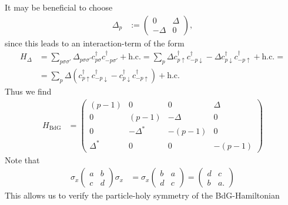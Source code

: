 \documentclass[english, parskip=full]{scrartcl}
\newcommand{\kla}{}
\newcommand{\tecxt}{}
\begin{document}
It may be beneficial to choose
\begin{align}
\Delta_p &:= \begin{pmatrix}
0 & \Delta \\ -\Delta & 0
\end{pmatrix},
\end{align}
since this leads to an interaction-term of the form
\begin{align}
H_\Delta &= \sum_{p\sigma\sigma'} \Delta_{p\sigma\sigma'} c_{p\sigma}^\dagger c_{-p\sigma'}^\dagger + \tecxt\text{h.c.} = \sum_p \Delta c_{p\uparrow}^\dagger c_{-p\downarrow}^\dagger - \Delta c_{p\downarrow}^\dagger c_{-p\uparrow}^\dagger + \tecxt\text{h.c.} = \\
&= \sum_p\Delta \kla\left( c_{p\uparrow}^\dagger c_{-p\downarrow}^\dagger - c_{p\downarrow}^\dagger c_{-p\uparrow}^\dagger \right) + \tecxt\text{h.c.}
\end{align}
Thus we find
\begin{align}
H_\tecxt\text{BdG}  &= \begin{pmatrix}
(p-1) & 0 & 0 & \Delta \\
0 & (p-1)  & -\Delta & 0 \\
0 & -\Delta^\ast & -(p-1) & 0 \\
\Delta^\ast & 0 & 0 & -(p-1)
\end{pmatrix}
\end{align}
Note that 
\begin{align}
\sigma_x\begin{pmatrix}
a&b \\ c&d
\end{pmatrix} \sigma_x &= \sigma_x\begin{pmatrix}
b & a \\ d & c
\end{pmatrix} = \begin{pmatrix}
d & c \\ b & a.
\end{pmatrix}
\end{align}
This allows us to verify the particle-holy symmetry of the BdG-Hamiltonian
\end{document}
